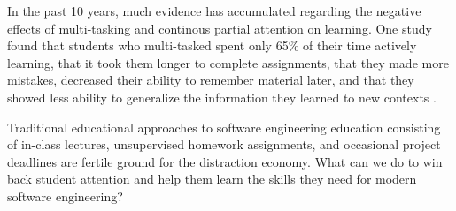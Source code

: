 
%
%

In the past 10 years, much evidence has accumulated regarding the negative effects of multi-tasking and continous partial attention on learning. One study found that students who multi-tasked spent only 65\% of their time actively learning, that it took them longer to complete assignments, that they made more mistakes, decreased their ability to remember material later, and that they showed less ability to generalize the information they learned to new contexts \cite{Paul2013}. 

Traditional educational approaches to software engineering education consisting of in-class lectures, unsupervised homework assignments, and occasional project deadlines are fertile ground for the distraction economy.  
What can we do to win back student attention and help them learn the skills they need for modern software engineering? 

